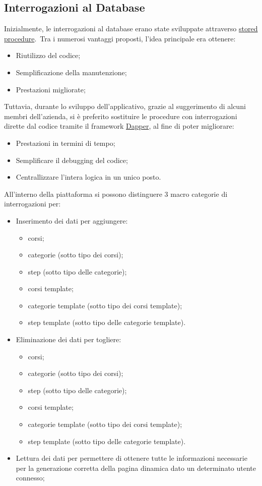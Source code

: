 \subsection{Interrogazioni al Database}
Inizialmente, le interrogazioni al database erano state sviluppate attraverso \href{https://learn.microsoft.com/it-it/sql/relational-databases/stored-procedures/stored-procedures-database-engine?view=sql-server-ver16}{stored 
procedure}.\ Tra i numerosi vantaggi proposti, l'idea principale era ottenere:
\begin{itemize}
	\item Riutilizzo del codice;
	\item Semplificazione della manutenzione;
	\item Prestazioni migliorate;
\end{itemize}
Tuttavia, durante lo sviluppo dell'applicativo, grazie al suggerimento di alcuni membri
dell'azienda, si è preferito sostituire le procedure con interrogazioni dirette dal codice
tramite il framework \href{https://learn.microsoft.com/it-it/azure/azure-sql/database/elastic-scale-working-with-dapper?view=azuresql}{Dapper}, al fine di poter migliorare:
\begin{itemize}
	\item Prestazioni in termini di tempo;
	\item Semplificare il debugging del codice;
	\item Centrallizzare l'intera logica in un unico posto.
\end{itemize}
All'interno della piattaforma si possono distinguere 3 macro categorie di interrogazioni per:
\begin{itemize}
	\item Inserimento dei dati per aggiungere:
	\begin{itemize}
		\item corsi;
		\item categorie (sotto tipo dei corsi);
		\item step (sotto tipo delle categorie);
		\item corsi template;
		\item categorie template (sotto tipo dei corsi template);
		\item step template (sotto tipo delle categorie template).
	\end{itemize}
	\item Eliminazione dei dati per togliere:
	\begin{itemize}
		\item corsi;
		\item categorie (sotto tipo dei corsi);
		\item step (sotto tipo delle categorie);
		\item corsi template;
		\item categorie template (sotto tipo dei corsi template);
		\item step template (sotto tipo delle categorie template).
	\end{itemize}
	\item Lettura dei dati per permettere di ottenere tutte le informazioni necessarie per la generazione
	corretta della pagina dinamica dato un determinato utente connesso;
\end{itemize}
%
